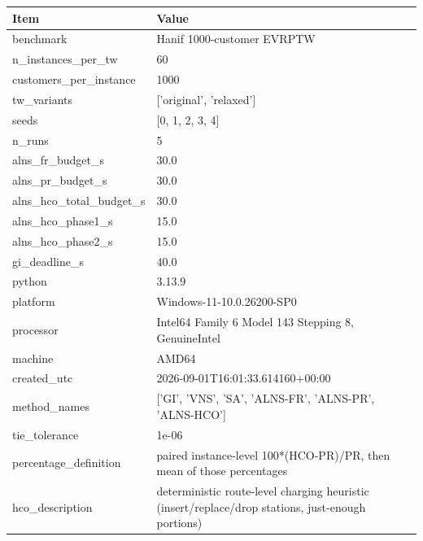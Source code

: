 \begin{tabular}{ll}
\toprule
Item & Value \\
\midrule
benchmark & Hanif 1000-customer EVRPTW \\
n_instances_per_tw & 60 \\
customers_per_instance & 1000 \\
tw_variants & ['original', 'relaxed'] \\
seeds & [0, 1, 2, 3, 4] \\
n_runs & 5 \\
alns_fr_budget_s & 30.0 \\
alns_pr_budget_s & 30.0 \\
alns_hco_total_budget_s & 30.0 \\
alns_hco_phase1_s & 15.0 \\
alns_hco_phase2_s & 15.0 \\
gi_deadline_s & 40.0 \\
python & 3.13.9 \\
platform & Windows-11-10.0.26200-SP0 \\
processor & Intel64 Family 6 Model 143 Stepping 8, GenuineIntel \\
machine & AMD64 \\
created_utc & 2026-09-01T16:01:33.614160+00:00 \\
method_names & ['GI', 'VNS', 'SA', 'ALNS-FR', 'ALNS-PR', 'ALNS-HCO'] \\
tie_tolerance & 1e-06 \\
percentage_definition & paired instance-level 100*(HCO-PR)/PR, then mean of those percentages \\
hco_description & deterministic route-level charging heuristic (insert/replace/drop stations, just-enough portions) \\
\bottomrule
\end{tabular}
